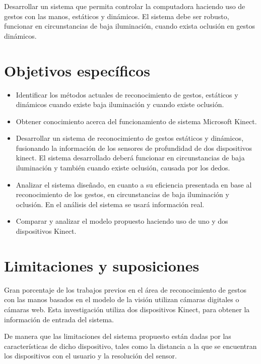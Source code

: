 Desarrollar un sistema que permita controlar la computadora haciendo uso de gestos con las manos, estáticos y dinámicos. El sistema debe ser robusto, funcionar en circunstancias de baja iluminación, cuando exista oclusión en gestos dinámicos.



\section{Objetivos espec\'ificos}\label{sec:objetivosEspecificos}

\begin{itemize}
	\item Identificar los m\'etodos actuales de reconocimiento de gestos, estáticos y din\'amicos cuando existe baja iluminación  y cuando existe oclusión. 
	
	\item  Obtener conocimiento acerca del funcionamiento de sistema Microsoft Kinect.
	
	\item Desarrollar un sistema de reconocimiento de gestos estáticos y dinámicos, fusionando la información de los sensores de  profundidad de dos dispositivos kinect. El sistema desarrollado deberá funcionar en circunstancias de baja iluminación y también cuando existe oclusión, causada por los dedos. 
	
	\item Analizar el sistema dise\~nado, en cuanto a su eficiencia presentada en base al reconocimiento de los gestos, en circunstancias de baja iluminación y oclusión. En el análisis del sistema se usar\'a información real.  
	
	\item Comparar y analizar el modelo propuesto haciendo uso de uno y dos dispositivos Kinect. 
\end{itemize}


\section{Limitaciones y suposiciones}\label{sec:Limitaciones&Suposiciones}

Gran porcentaje de los trabajos previos en el \'area de reconocimiento de gestos con las manos basados en el modelo de la visión  utilizan c\'amaras digitales o c\'amaras web. Esta investigación utiliza dos dispositivos Kinect, para obtener la información de entrada del sistema.

De  manera que las limitaciones del sistema propuesto están dadas por las características de dicho dispositivo, tales como la distancia  a la que se encuentran los dispositivos con el usuario y la resolución del sensor. 

